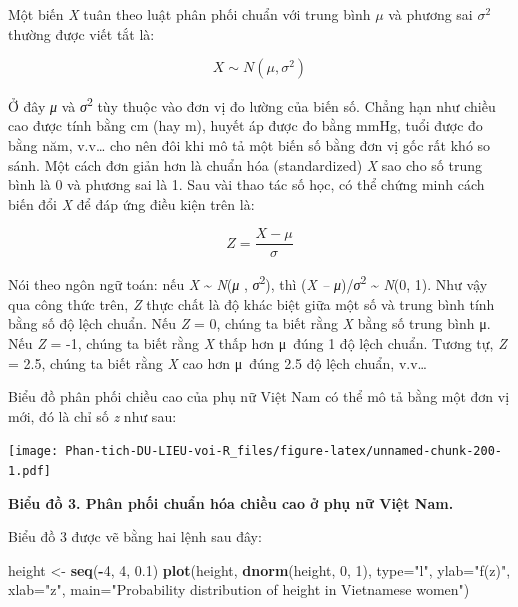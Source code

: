 \documentclass[
]{book}
\newenvironment{Shaded}{\begin{snugshade}}{\end{snugshade}}
\newcommand{\DataTypeTok}[1]{\textcolor[rgb]{0.13,0.29,0.53}{#1}}
\newcommand{\DecValTok}[1]{\textcolor[rgb]{0.00,0.00,0.81}{#1}}
\newcommand{\FloatTok}[1]{\textcolor[rgb]{0.00,0.00,0.81}{#1}}
\newcommand{\KeywordTok}[1]{\textcolor[rgb]{0.13,0.29,0.53}{\textbf{#1}}}
\newcommand{\NormalTok}[1]{#1}
\newcommand{\OperatorTok}[1]{\textcolor[rgb]{0.81,0.36,0.00}{\textbf{#1}}}
\newcommand{\StringTok}[1]{\textcolor[rgb]{0.31,0.60,0.02}{#1}}
\begin{document}
Một biến \emph{X} tuân theo luật phân phối chuẩn với trung bình \(μ\) và phương sai \(σ^{2}\) thường được viết tắt là:

\[X \sim N(μ , σ^{2})\]

Ở đây \emph{μ} và \emph{σ}\textsuperscript{2} tùy thuộc vào đơn vị đo lường của biến số. Chẳng hạn như chiều cao được tính bằng cm (hay m), huyết áp được đo bằng mmHg, tuổi được đo bằng năm, v.v\ldots{} cho nên đôi khi mô tả một biến số bằng đơn vị gốc rất khó so sánh. Một cách đơn giản hơn là chuẩn hóa (standardized) \emph{X} sao cho số trung bình là 0 và phương sai là 1. Sau vài thao tác số học, có thể chứng minh cách biến đổi \emph{X} để đáp ứng điều kiện trên là:

\[Z = \frac{X - \mu}{\sigma}\]

Nói theo ngôn ngữ toán: nếu \emph{X} \textasciitilde{} \emph{N}(\emph{μ} , \emph{σ}\textsuperscript{2}), thì (\emph{X -- μ})/\emph{σ}\textsuperscript{2} \textasciitilde{} \emph{N}(0, 1). Như vậy qua công thức trên, \emph{Z} thực chất là độ khác biệt giữa một số và trung bình tính bằng số độ lệch chuẩn. Nếu \emph{Z} = 0, chúng ta biết rằng \emph{X} bằng số trung bình μ. Nếu \emph{Z} = -1, chúng ta biết rằng \emph{X} thấp hơn μ~đúng 1 độ lệch chuẩn. Tương tự, \emph{Z} = 2.5, chúng ta biết rằng \emph{X} cao hơn μ~đúng 2.5 độ lệch chuẩn, v.v\ldots{}

Biểu đồ phân phối chiều cao của phụ nữ Việt Nam có thể mô tả bằng một đơn vị mới, đó là chỉ số \emph{z} như sau:

\texttt{[image: Phan-tich-DU-LIEU-voi-R\_files/figure-latex/unnamed-chunk-200-1.pdf]}

\textbf{Biểu đồ 3. Phân phối chuẩn hóa chiều cao ở phụ nữ Việt Nam.}

Biểu đồ 3 được vẽ bằng hai lệnh sau đây:

\begin{Shaded}
\begin{Highlighting}[]
\NormalTok{height \textless{}{-}}\StringTok{ }\KeywordTok{seq}\NormalTok{(}\OperatorTok{{-}}\DecValTok{4}\NormalTok{, }\DecValTok{4}\NormalTok{, }\FloatTok{0.1}\NormalTok{)}
\KeywordTok{plot}\NormalTok{(height, }\KeywordTok{dnorm}\NormalTok{(height, }\DecValTok{0}\NormalTok{, }\DecValTok{1}\NormalTok{), }
       \DataTypeTok{type=}\StringTok{"l"}\NormalTok{, }
       \DataTypeTok{ylab=}\StringTok{"f(z)"}\NormalTok{,}
       \DataTypeTok{xlab=}\StringTok{"z"}\NormalTok{,}
       \DataTypeTok{main=}\StringTok{"Probability distribution of height in Vietnamese women"}\NormalTok{)}
\end{Highlighting}
\end{Shaded}
\end{document}
